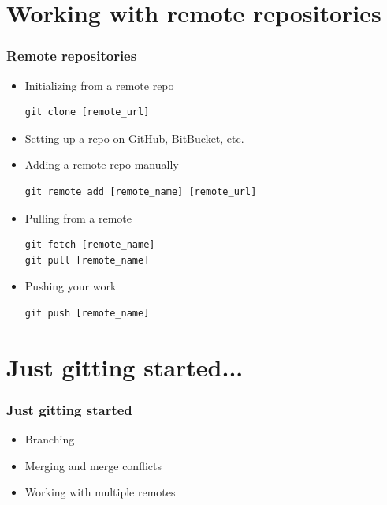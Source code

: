 \documentclass[10pt,t,sans,mathsans,xcolor=dvipsnames]{beamer}
\begin{document}
\section{Working with remote repositories}
\begin{frame}[fragile]
\frametitle{Remote repositories}
\begin{itemize}[<+->]
\item Initializing from a remote repo
\begin{lstlisting}
git clone [remote_url]
\end{lstlisting}
\item Setting up a repo on GitHub, BitBucket, etc.
\item Adding a remote repo manually
\begin{lstlisting}
git remote add [remote_name] [remote_url]
\end{lstlisting}
\item Pulling from a remote
\begin{lstlisting}
git fetch [remote_name]
git pull [remote_name]
\end{lstlisting}
\item Pushing your work
\begin{lstlisting}
git push [remote_name]
\end{lstlisting}
\end{itemize}
\end{frame}
\section{Just gitting started...}
\begin{frame}[fragile]%
\frametitle{Just gitting started}
\pause
\begin{itemize}[<+->]
\item Branching
\item Merging and merge conflicts
\item Working with multiple remotes
\end{itemize}
\end{frame}
\end{document}
